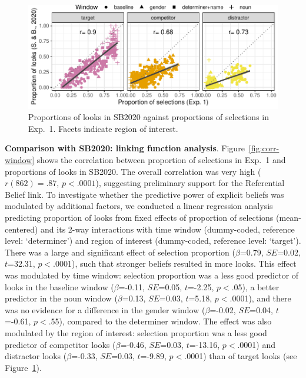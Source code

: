 \documentclass[10pt,letterpaper]{article}
\newcommand{\figref}[1]{Figure~\ref{#1}}
\newcommand{\expref}[1]{Exp.~#1}
\newcommand{\jd}[1]{\textcolor{Red}{\textbf{[jd: #1]}}}
\begin{document}
\begin{figure}
\centering
\includegraphics[width=\columnwidth]{../../analysis/SunBreheny/1_incremental/main/graphs/corr-region}
\caption{Proportions of looks in SB2020 against proportions of selections in \expref{1}. Facets indicate region of interest.} 
\label{fig:corr-region}
\end{figure}

\textbf{Comparison with SB2020: linking function analysis}. \figref{fig:corr-window} shows the correlation between  proportion of selections in \expref{1} and proportions of looks in SB2020. The overall correlation was very high ($r(862) = .87$, $p < .0001$), suggesting preliminary support for the Referential Belief link. To investigate whether the predictive power of explicit beliefs was modulated by additional factors, we conducted a linear regression analysis %
predicting proportion of looks from fixed effects of proportion of selections (mean-centered) and its 2-way interactions with time window (dummy-coded, reference level: `determiner') and region of interest (dummy-coded, reference level: `target'). There was a large and significant effect of selection proportion  ($\beta$=0.79, $SE$=0.02, $t$=32.31, $p<$.0001), such that stronger beliefs resulted in more looks. This effect was modulated by time window: selection proportion was a less good predictor of looks in the baseline window   ($\beta$=-0.11, $SE$=0.05, $t$=-2.25, $p<$.05), a better predictor in the noun window   ($\beta$=0.13, $SE$=0.03, $t$=5.18, $p<$.0001), and there was no evidence for a difference in the gender window    ($\beta$=-0.02, $SE$=0.04, $t$=-0.61, $p<$.55), compared to the determiner window. The effect was also modulated by the region of interest: selection proportion was a less good predictor of competitor looks ($\beta$=-0.46, $SE$=0.03, $t$=-13.16, $p<$.0001) and distractor looks  ($\beta$=-0.33, $SE$=0.03, $t$=-9.89, $p<$.0001) than of target looks (see \figref{fig:corr-region}).
\end{document}
